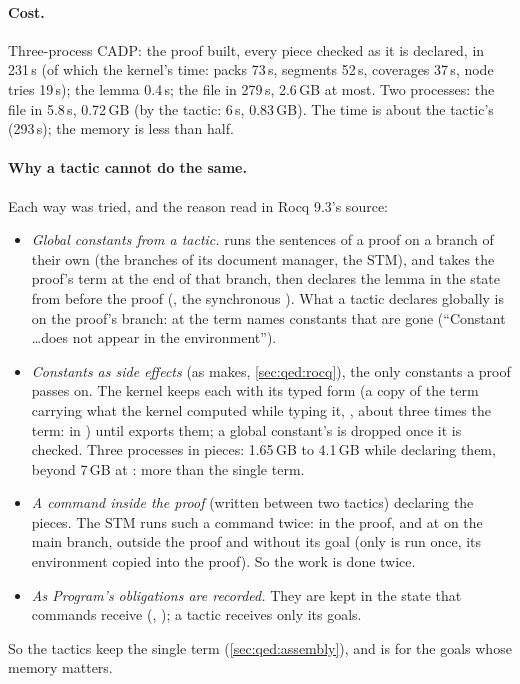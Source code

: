 \paragraph{Cost.} Three-process CADP: the proof built, every piece
checked as it is declared, in 231\,s (of which the kernel's time: packs
73\,s, segments 52\,s, coverages 37\,s, node tries 19\,s); the lemma
0.4\,s; the file in 279\,s, 2.6\,GB at most. Two processes: the file in
5.8\,s, 0.72\,GB (by the tactic: 6\,s, 0.83\,GB). The time is about the
tactic's (293\,s); the memory is less than half.

\paragraph{Why a tactic cannot do the same.} Each way was tried, and
the reason read in Rocq 9.3's source:
\begin{itemize}
\item \emph{Global constants from a tactic.}  runs
  the sentences of a proof on a branch of their own (the branches of its
  document manager, the STM), and  takes the proof's term at
  the end of that branch, then declares the lemma in the state from
  before the proof (, the synchronous ). What
  a tactic declares globally is on the proof's branch: at  the
  term names constants that are gone (``Constant \dots does not appear
  in the environment'').
\item \emph{Constants as side effects} (as  makes,
  \cref{sec:qed:rocq}), the only constants a proof passes on. The kernel
  keeps each with its typed form (a copy of the term carrying what the
  kernel computed while typing it, , about three times the
  term:  in ) until
   exports them; a global constant's is dropped once it is
  checked. Three processes in pieces: 1.65\,GB to 4.1\,GB while
  declaring them, beyond 7\,GB at : more than the single term.
\item \emph{A command inside the proof} (written between two tactics)
  declaring the pieces. The STM runs such a command twice: in the proof,
  and at  on the main branch, outside the proof and without
  its goal (only  is run once, its
  environment copied into the proof). So the work is done twice.
\item \emph{As Program's obligations are recorded.} They are kept in the
  state that commands receive (,
  ); a tactic receives only its goals.
\end{itemize}
So the tactics keep the single term (\cref{sec:qed:assembly}), and
 is for the goals whose memory matters.

